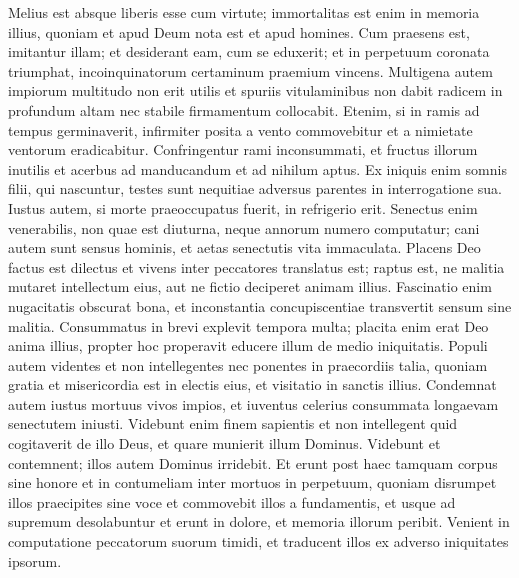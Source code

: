 \begin{biblechapter}  
\verse Melius est absque liberis esse cum virtute; immortalitas est enim in memoria illius, quoniam et apud Deum nota est et apud homines. 
\verse Cum praesens est, imitantur illam; et desiderant eam, cum se eduxerit; et in perpetuum coronata triumphat, incoinquinatorum certaminum praemium vincens. 
\verse Multigena autem impiorum multitudo non erit utilis et spuriis vitulaminibus non dabit radicem in profundum altam nec stabile firmamentum collocabit. 
\verse Etenim, si in ramis ad tempus germinaverit, infirmiter posita a vento commovebitur et a nimietate ventorum eradicabitur. 
\verse Confringentur rami inconsummati, et fructus illorum inutilis et acerbus ad manducandum et ad nihilum aptus. 
\verse Ex iniquis enim somnis filii, qui nascuntur, testes sunt nequitiae adversus parentes in interrogatione sua. 
\verse Iustus autem, si morte praeoccupatus fuerit, in refrigerio erit. 
\verse Senectus enim venerabilis, non quae est diuturna, neque annorum numero computatur; 
\verse cani autem sunt sensus hominis, et aetas senectutis vita immaculata. 
\verse Placens Deo factus est dilectus et vivens inter peccatores translatus est; 
\verse raptus est, ne malitia mutaret intellectum eius, aut ne fictio deciperet animam illius. 
\verse Fascinatio enim nugacitatis obscurat bona, et inconstantia concupiscentiae transvertit sensum sine malitia. 
\verse Consummatus in brevi explevit tempora multa; 
\verse placita enim erat Deo anima illius, propter hoc properavit educere illum de medio iniquitatis. Populi autem videntes et non intellegentes nec ponentes in praecordiis talia, 
\verse quoniam gratia et misericordia est in electis eius, et visitatio in sanctis illius. 
\verse Condemnat autem iustus mortuus vivos impios, et iuventus celerius consummata longaevam senectutem iniusti. 
\verse Videbunt enim finem sapientis et non intellegent quid cogitaverit de illo Deus, et quare munierit illum Dominus. 
\verse Videbunt et contemnent; illos autem Dominus irridebit. 
\verse Et erunt post haec tamquam corpus sine honore et in contumeliam inter mortuos in perpetuum, quoniam disrumpet illos praecipites sine voce et commovebit illos a fundamentis, et usque ad supremum desolabuntur et erunt in dolore, et memoria illorum peribit. 
\verse Venient in computatione peccatorum suorum timidi, et traducent illos ex adverso iniquitates ipsorum. 
\end{biblechapter}

